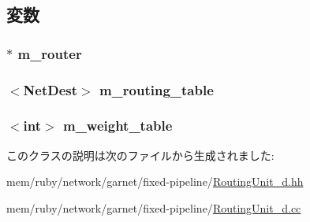 \subsection{変数}
\hypertarget{classRoutingUnit__d_a81d53a65b375007289068e764da769d8}{
\subsubsection[{m\_\-router}]{$\ast$ {\bf m\_\-router}}}
\label{classRoutingUnit__d_a81d53a65b375007289068e764da769d8}
\hypertarget{classRoutingUnit__d_adce3e392ac98699a80750fa4a4aa9b40}{
\subsubsection[{m\_\-routing\_\-table}]{$<${\bf NetDest}$>$ {\bf m\_\-routing\_\-table}}}
\label{classRoutingUnit__d_adce3e392ac98699a80750fa4a4aa9b40}
\hypertarget{classRoutingUnit__d_aba33ddf03ca5025736337ef48660bd04}{
\subsubsection[{m\_\-weight\_\-table}]{$<$int$>$ {\bf m\_\-weight\_\-table}}}
\label{classRoutingUnit__d_aba33ddf03ca5025736337ef48660bd04}


このクラスの説明は次のファイルから生成されました:\begin{DoxyCompactItemize}
\item 
mem/ruby/network/garnet/fixed-\/pipeline/\hyperlink{RoutingUnit__d_8hh}{RoutingUnit\_\-d.hh}\item 
mem/ruby/network/garnet/fixed-\/pipeline/\hyperlink{RoutingUnit__d_8cc}{RoutingUnit\_\-d.cc}\end{DoxyCompactItemize}

